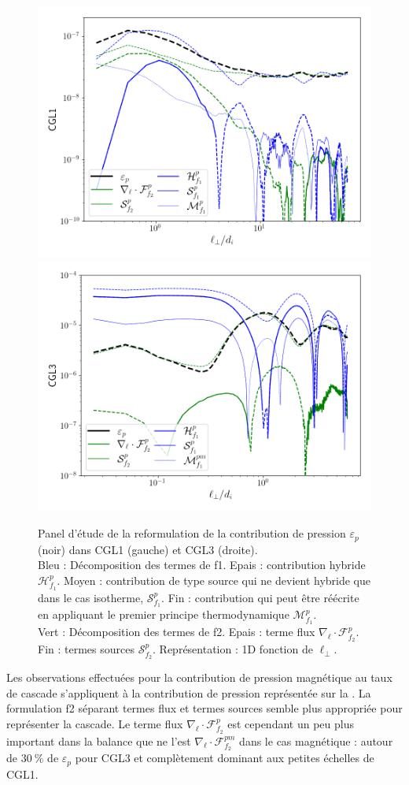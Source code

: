  \begin{figure}[!ht]
  \centering
  \includegraphics[width=0.49\linewidth,trim=1cm 1cm 1cm 1cm, clip=true]{./Mainmatter/Part_3/images_ch2/CGL1_f2p_1D_lperp}
 \hfill
 \includegraphics[width=0.49\linewidth,trim=1cm 1cm 1cm 1cm, clip=true]{./Mainmatter/Part_3/images_ch2/CGL3_f2p_1D_lperp}
 \cprotect\caption{Panel d'étude de la reformulation de la contribution de pression \ensuremath{\varepsilon_{p}} (noir) dans CGL1 (gauche) et CGL3 (droite). \\Bleu : Décomposition des termes de f1. Epais : contribution hybride \ensuremath{\mathcal{H}^{p}_{f_1}}. Moyen : contribution de type source qui ne devient hybride que dans le cas isotherme, \ensuremath{\mathcal{S}^{p}_{f_1}}. Fin : contribution qui peut être réécrite en appliquant le premier principe thermodynamique \ensuremath{\mathcal{M}^{p}_{f_1}}.\\Vert : Décomposition des termes de f2. Epais : terme flux \ensuremath{\nabla_{\boldsymbol{\ell}} \cdot \mathcal{F}^{p}_{f_2}}. Fin : termes sources \ensuremath{\mathcal{S}^{p}_{f_2}}. Représentation : 1D fonction de \ensuremath{\ell_{\perp}}.}
 \label{fig:elf2p}
 \end{figure}
 
 Les observations effectuées pour la contribution de pression magnétique au taux de cascade s'appliquent à la contribution de pression représentée sur la  . La formulation f2 séparant termes flux et termes sources semble plus appropriée pour représenter la cascade. Le terme flux $\nabla_{\boldsymbol{\ell}} \cdot \mathcal{F}^{p}_{f_2}$ est cependant un peu plus important dans la balance que ne l'est $\nabla_{\boldsymbol{\ell}} \cdot \mathcal{F}^{pm}_{f_2}$ dans le cas magnétique : autour de $\SI{30}{\%}$ de $\varepsilon_{p}$ pour CGL3 et complètement dominant aux petites échelles de CGL1. 
 
